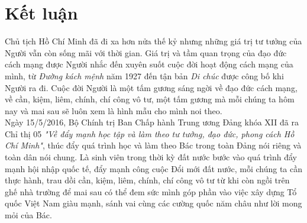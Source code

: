 \section{Kết luận}
Chủ tịch Hồ Chí Minh đã đi xa hơn nửa thế kỷ nhưng những giá trị tư tưởng của Người vẫn còn sống mãi với thời gian. Giá trị và tầm quan trọng của đạo đức cách mạng được Người nhắc đến xuyên suốt cuộc đời hoạt động cách mạng của mình, từ \textit{Đường kách mệnh} năm 1927 đến tận bản \textit{Di chúc} được công bố khi Người ra đi. Cuộc đời Người là một tấm gương sáng ngời về đạo đức cách mạng, về cần, kiệm, liêm, chính, chí công vô tư, một tấm gương mà mỗi chúng ta hôm nay và mai sau sẽ luôn xem là hình mẫu cho mình noi theo.\\
Ngày 15/5/2016, Bộ Chính trị Ban Chấp hành Trung ương Đảng khóa XII đã ra Chỉ thị 05 \textit{"Về đẩy mạnh học tập và làm theo tư tưởng, đạo đức, phong cách Hồ Chí Minh"}, thúc đẩy quá trình học và làm theo Bác trong toàn Đảng nói riêng và toàn dân nói chung. Là sinh viên trong thời kỳ đất nước bước vào quá trình đẩy mạnh hội nhập quốc tế, đẩy mạnh công cuộc Đổi mới đất nước, mỗi chúng ta cần thực hành, trau dồi cần, kiệm, liêm, chính, chí công vô tư từ khi còn ngồi trên ghế nhà trường để mai sau có thể đem sức mình góp phần vào việc xây dựng Tổ quốc Việt Nam giàu mạnh, sánh vai cùng các cường quốc năm châu như lời mong mỏi của Bác.
